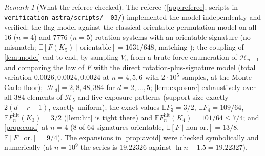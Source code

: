 \documentclass[11pt,a4paper]{article}
\theoremstyle{plain}
\theoremstyle{definition}
\theoremstyle{remark}
\newtheorem{remark}[theorem]{Remark}
\newcommand{\E}{\mathbb E}
\newcommand{\cH}{\mathcal H}
\newcommand{\Fhit}{F_n^{\mathrm{hit}}}
\begin{document}
\begin{remark}[What the referee checked]\label{rem:checks}
The referee (\cref{app:referee}; scripts in \texttt{verification\_astra/\allowbreak scripts/\_\_03/}) implemented the model independently and verified: the flag model against the classical orientable permutation model on all $16$ ($n=4$) and $7776$ ($n=5$) rotation systems with an orientable signature (no mismatch; $\E[F(K_5)\mid\text{orientable}]=1631/648$, matching \cite{Note02}); the coupling of \cref{lem:model} end-to-end, by sampling $V_u$ from a brute-force enumeration of $\cH_{n-1}$ and comparing the law of $F$ with the direct rotation-plus-signature model (total variation $0.0026,0.0024,0.0024$ at $n=4,5,6$ with $2\cdot10^5$ samples, at the Monte Carlo floor); $|\cH_d|=2,8,48,384$ for $d=2,\dots,5$; \cref{lem:exposure} exhaustively over all $384$ elements of $\cH_5$ and five exposure patterns (support size exactly $2(d-r-1)$, exactly uniform); the exact values $\E F_3=3/2$, $\E F_4=109/64$, $\E\Fhit(K_3)=3/2$ (\cref{lem:hit} is tight there) and $\E\Fhit(K_4)=101/64\le7/4$; and \cref{prop:cond} at $n=4$ ($8$ of $64$ signatures orientable, $\E[F\mid\text{non-or.}]=13/8$, $\E[F\mid\text{or.}]=9/4$). The expansions in \cref{prop:avoid} were checked symbolically and numerically (at $n=10^9$ the series is $19.22326$ against $\ln n-1.5=19.22327$).
\end{remark}
\end{document}
